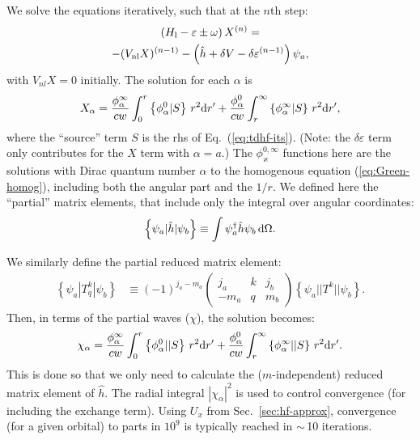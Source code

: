 \documentclass[10pt,twocolumn,a4paper]{article}%
\newcommand{\threej}[6]{\ensuremath{\begin{pmatrix}#1&#2&#3\\#4&#5&#6\end{pmatrix}}}	%
\newcommand{\be}{\begin{equation}}
\newcommand{\ee}{\end{equation}}
\def\d{\ensuremath{{\rm d}}}
\newcommand{\psidag}{\ensuremath{\psi^\dagger}}	%
\def\en{\ensuremath{\varepsilon}}
\renewcommand{\a}{\ensuremath{\alpha}}
\renewcommand{\k}{\ensuremath{\kappa}}
\newcommand{\vk}{\ensuremath{\varkappa}}
\newcommand{\w}{\ensuremath{\omega}}
\begin{document}
We solve the equations iteratively, such that at the $n$th step:
\begin{multline}\label{eq:tdhf-its}
\left( H_{\rm l} - \en \pm\w \right)X^{(n)} =
 \\
 - (V_{\rm nl} X)^{(n-1)} - \left(\hat h  + \delta V- \delta \en^{(n-1)} \right)\psi_a,
\end{multline}
with $V_{nl}X= 0$ initially.
The solution for each $\a$ is
\be\label{eq:del-phi-tdhf}
X_\a = \frac{\phi_\a^\infty}{cw}\int_0^r\left\{\phi^0_\a|S\right\}\,r^2\d r'
+ \frac{\phi_\a^0}{cw}\int_r^\infty\left\{\phi^\infty_\a|S\right\}\,r^2\d r',
\ee
where the ``source'' term $S$ is the rhs of Eq.~(\ref{eq:tdhf-its}).
(Note: the $\delta\en$ term only contributes for the $X$ term with $\a=a$.)
The $\phi_\vk^{0,\infty}$ functions here are the solutions with Dirac quantum number $\a$ to the homogenous equation (\ref{eq:Green-homog}), including both the angular part and the $1/r$.
We defined here the ``partial'' matrix elements, that include only the integral over angular coordinates:
\be
\left\{\psi_a|\hat h|\psi_b\right\} \equiv \int \psidag_a \hat h\psi_b \,\d\Omega.
\ee




We similarly define the partial reduced matrix element:
\begin{align}\label{eq:partial-rme}
\left\{\psi_a|T^k_q|\psi_b\right\} &\equiv (-1)^{j_a-m_a}\threej{j_a}{k}{j_b}{-m_a}{q}{m_b}\left\{\psi_a||T^k||\psi_b\right\}.
\end{align}
Then, in terms of the partial waves ($\chi$), the solution becomes:
\be\label{eq:del-phi-tdhf2}
\chi_\a = \frac{\phi_\a^\infty}{cw}\int_0^r\left\{\phi^0_\a||S\right\}\,r^2\d r'
+ \frac{\phi_\a^0}{cw}\int_r^\infty\left\{\phi^\infty_\a||S\right\}\,r^2\d r'.
\ee
This is done so that we only need to calculate the ($m$-independent) {\rm reduced} matrix element of $\hat h$.
The radial integral $|\chi_\a|^2$ is used to control convergence (for including the exchange term).
Using $U_x$ from Sec.~\ref{sec:hf-approx}, convergence (for a given orbital) to parts in $10^9$ is typically reached in $\sim$\,10 iterations.

\end{document}

